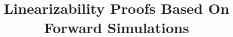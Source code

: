 \documentclass[orivec]{llncs}
\title{Linearizability Proofs Based On Forward Simulations}
\author{ }
\institute{ }
\begin{document}
\maketitle

\begin{abstract}

\end{abstract}







%






\newpage
\appendix




\end{document}
